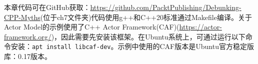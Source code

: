 本章代码可在GitHub获取：\url{https://github.com/PacktPublishing/Debunking-CPP-Myths}(位于ch7文件夹)代码使用g++和C++20标准通过Makefile编译。关于Actor Model的示例使用了C++ Actor Framework(CAF)(\url{https://actor-framework.org/})，因此需要先安装该框架。在Ubuntu系统上，可通过运行以下命令安装：\verb|apt install libcaf-dev|。示例中使用的CAF版本是Ubuntu官方稳定版库：0.17版本。